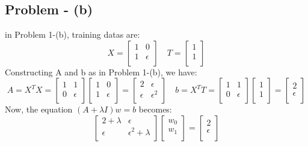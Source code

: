 \documentclass{article}
\begin{document}
\subsection{Problem - (b)}
in Problem 1-(b), training datas are:
\[
X=\begin{bmatrix}
    1 & 0 \\
    1 & \epsilon \\
\end{bmatrix}
\hspace{1em}
T=\begin{bmatrix}
    1 \\
    1 \\
\end{bmatrix}
\]
Constructing A and b as in Problem 1-(b), we have:
\[
A = X^{T}X=\begin{bmatrix}
    1 & 1 \\
    0 & \epsilon \\
\end{bmatrix}
\begin{bmatrix}
    1 & 0 \\
    1 & \epsilon \\
\end{bmatrix}
=
\begin{bmatrix}
    2 & \epsilon \\
    \epsilon & \epsilon^{2} \\
\end{bmatrix}
\hspace{1em}
b = X^{T}T=
\begin{bmatrix}
    1 & 1\\
    0 & \epsilon \\
\end{bmatrix}
\begin{bmatrix}
    1 \\
    1 \\
\end{bmatrix}
=
\begin{bmatrix}
    2 \\
    \epsilon \\
\end{bmatrix}
\]
Now, the equation $(A+\lambda I)w = b$ becomes:
\[
\begin{bmatrix}
    2+\lambda & \epsilon \\
    \epsilon & \epsilon^{2}+\lambda \\
\end{bmatrix}
\begin{bmatrix}
    w_{0} \\
    w_{1} \\
\end{bmatrix}
=
\begin{bmatrix}
    2 \\
    \epsilon \\
\end{bmatrix}
\]
\end{document}
